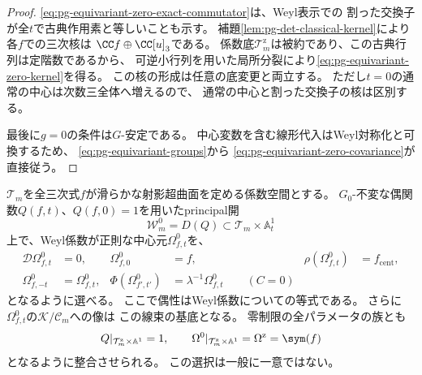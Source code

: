 \begin{proof}
\eqref{eq:pg-equivariant-zero-exact-commutator}は、Weyl表示での
割った交換子が全$t$で古典作用素と等しいことも示す。
補題\ref{lem:pg-det-classical-kernel}により各$f$での三次核は
$\CC f\oplus\CC[u]_3$である。
係数底$\mathcal T_m^{\mathrm z}$は被約であり、この古典行列は定階数であるから、
可逆小行列を用いた局所分裂により\eqref{eq:pg-equivariant-zero-kernel}を得る。
この核の形成は任意の底変更と両立する。
ただし$t=0$の通常の中心は次数三全体へ増えるので、
通常の中心と割った交換子の核は区別する。

最後に$g=0$の条件は$G$-安定である。
中心変数を含む線形代入はWeyl対称化と可換するため、
\eqref{eq:pg-equivariant-groups}から
\eqref{eq:pg-equivariant-zero-covariance}が直接従う。
\end{proof}

\begin{theorem}[還元的部分群に関する中心元の同変選択]
\label{thm:pg-equivariant-levi-center}
$\mathcal T_m$を全三次式$f$が滑らかな射影超曲面を定める係数空間とする。
$G_0$-不変な偶関数$Q(f,t)$、$Q(f,0)=1$を用いたprincipal開
\begin{equation}
 \mathcal W_m^0=D(Q)\subset\mathcal T_m\times\mathbb A^1_t
 \label{eq:pg-equivariant-levi-open}
\end{equation}
上で、Weyl係数が正則な中心元$\Omega^0_{f,t}$を、
\begin{equation}
 \begin{aligned}
 \mathcal D\Omega^0_{f,t}&=0,&
 \Omega^0_{f,0}&=f,&
 \rho(\Omega^0_{f,t})&=f_{\mathrm{cent}},\\
 \Omega^0_{f,-t}&=\Omega^0_{f,t},&
 \Phi(\Omega^0_{f',t'})&=\lambda^{-1}\Omega^0_{f,t}\qquad(C=0)
 \end{aligned}
 \label{eq:pg-equivariant-levi-center}
\end{equation}
となるように選べる。
ここで偶性はWeyl係数についての等式である。
さらに$\Omega^0_{f,t}$の$\mathcal K/\mathcal C_m$への像は
この線束の基底となる。
零制限の全パラメータの族とも
\begin{equation}
 Q|_{\mathcal T_m^{\mathrm z}\times\mathbb A^1}=1,
 \qquad
 \Omega^0|_{\mathcal T_m^{\mathrm z}\times\mathbb A^1}
 =\Omega^{\mathrm z}=\sym(f)
 \label{eq:pg-equivariant-levi-zero-compatibility}
\end{equation}
となるように整合させられる。
この選択は一般に一意ではない。
\end{theorem}

